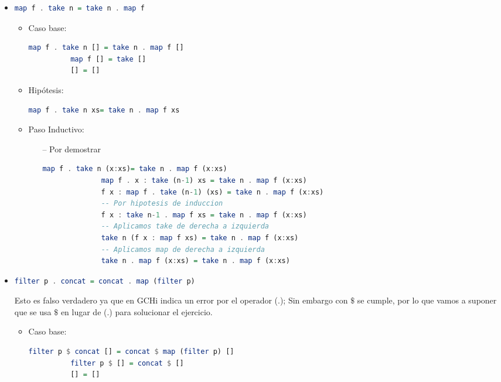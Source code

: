 \documentclass[spanish,12pt,letterpaper]{article}
\begin{document}
\begin{itemize}
  \item
    \begin{lstlisting}[language=Haskell]
      map f . take n = take n . map f\end{lstlisting}
      \begin{itemize}
      \item Caso base:
        \begin{lstlisting}[language=Haskell]
          map f . take n [] = take n . map f []
          map f [] = take []
          [] = []\end{lstlisting}
      \item Hipótesis:
        \begin{lstlisting}[language=Haskell]
          map f . take n xs= take n . map f xs\end{lstlisting}
        \item Paso Inductivo:
  	  \begin{itemize}
  	  \item[--] Por demostrar
            \begin{lstlisting}[language=Haskell]
              map f . take n (x:xs)= take n . map f (x:xs)
              map f . x : take (n-1) xs = take n . map f (x:xs)
              f x : map f . take (n-1) (xs) = take n . map f (x:xs)
              -- Por hipotesis de induccion
              f x : take n-1 . map f xs = take n . map f (x:xs)
              -- Aplicamos take de derecha a izquierda
              take n (f x : map f xs) = take n . map f (x:xs)
              -- Aplicamos map de derecha a izquierda
              take n . map f (x:xs) = take n . map f (x:xs)\end{lstlisting}
          \end{itemize}
      \end{itemize}
    \item
      \begin{lstlisting}[language=Haskell]
        filter p . concat = concat . map (filter p)\end{lstlisting}
      Esto es falso verdadero ya que en GCHi indica un error por el
      operador (.); Sin embargo con $\$$ se cumple, por lo que vamos
      a suponer que se usa $\$$ en lugar de (.) para solucionar el
      ejercicio.
      \begin{itemize}
      \item Caso base:
	\begin{lstlisting}[language=Haskell]
          filter p $ concat [] = concat $ map (filter p) []
          filter p $ [] = concat $ []
          [] = []\end{lstlisting}

\end{itemize}
\end{itemize}
\end{document}
